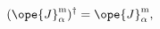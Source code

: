 \begin{equation}	\label{4.2}
(\ope{J}_\alpha^{\mathrm{m}})^\dag = \ope{J}_\alpha^{\mathrm{m}} ,
	\end{equation}

